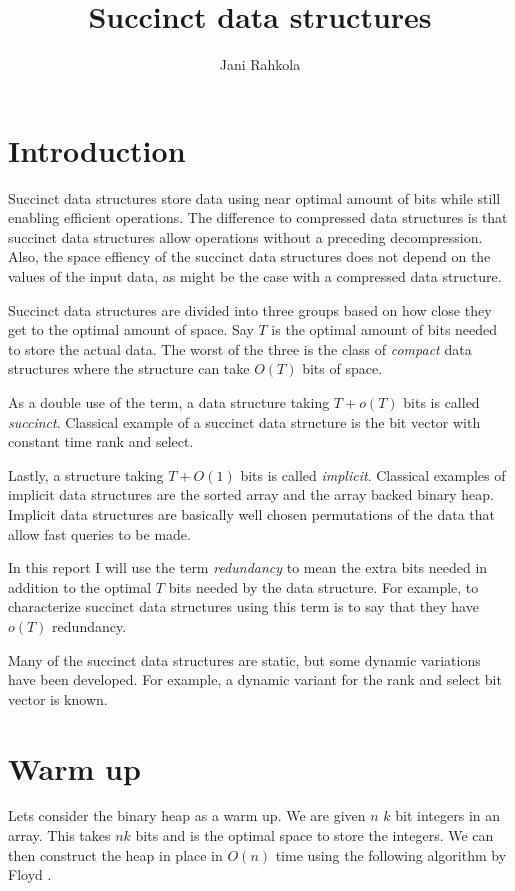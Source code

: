 \documentclass[11pt]{article}
\title{Succinct data structures}
\author{Jani Rahkola}
\newcommand{\bigo}{O}
\newcommand{\smallo}{o}
\begin{document}
\maketitle

\section{Introduction}

Succinct data structures store data using near optimal amount of bits
while still enabling efficient operations. The difference to
compressed data structures is that succinct data structures allow
operations without a preceding decompression. Also, the space effiency
of the succinct data structures does not depend on the values of the
input data, as might be the case with a compressed data structure.

Succinct data structures are divided into three groups based on how
close they get to the optimal amount of space. Say $T$ is the optimal
amount of bits needed to store the actual data. The worst of the three
is the class of \emph{compact} data structures where the structure can
take $\bigo(T)$ bits of space.

As a double use of the term, a data structure taking $T + \smallo(T)$
bits is called \emph{succinct}. Classical example of a succinct data
structure is the bit vector with constant time rank and select.

Lastly, a structure taking $T + \bigo(1)$ bits is called
\emph{implicit}. Classical examples of implicit data structures are
the sorted array and the array backed binary heap. Implicit data
structures are basically well chosen permutations of the data that
allow fast queries to be made.

In this report I will use the term \emph{redundancy} to mean the extra
bits needed in addition to the optimal $T$ bits needed by the data
structure. For example, to characterize succinct data structures using
this term is to say that they have $\smallo(T)$ redundancy.

Many of the succinct data structures are static, but some dynamic
variations have been developed. For example, a dynamic variant for the
rank and select bit vector is known.

\section{Warm up}

Lets consider the binary heap as a warm up. We are given $n$ $k$ bit
integers in an array. This takes $nk$ bits and is the optimal space to
store the integers. We can then construct the heap in place in
$\bigo(n)$ time using the following algorithm by Floyd \cite{floyd64}.
\end{document}
